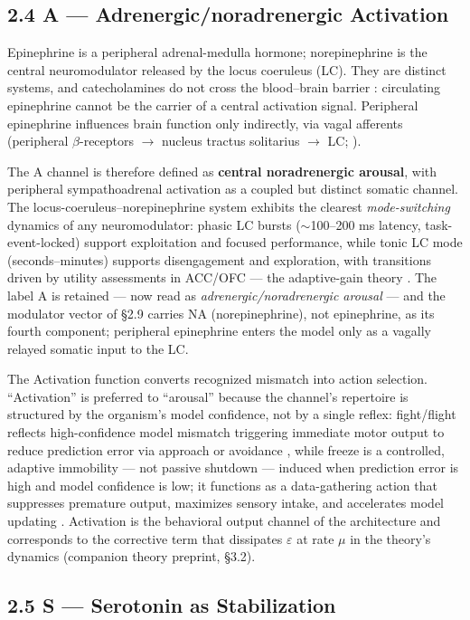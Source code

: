 \documentclass[
]{article}
\begin{document}
\subsection{2.4 A --- Adrenergic/noradrenergic
Activation}\label{a-adrenergicnoradrenergic-activation}

Epinephrine is a peripheral adrenal-medulla hormone; norepinephrine is
the central neuromodulator released by the locus coeruleus (LC). They
are distinct systems, and catecholamines do not cross the blood--brain
barrier : circulating epinephrine cannot be the carrier of a central
activation signal. Peripheral epinephrine influences brain function only
indirectly, via vagal afferents (peripheral \(\beta\)-receptors \(\to\)
nucleus tractus solitarius \(\to\) LC; ).

The A channel is therefore defined as \textbf{central noradrenergic
arousal}, with peripheral sympathoadrenal activation as a coupled but
distinct somatic channel. The locus-coeruleus--norepinephrine system
exhibits the clearest \emph{mode-switching} dynamics of any
neuromodulator: phasic LC bursts (\(\sim\)100--200 ms latency,
task-event-locked) support exploitation and focused performance, while
tonic LC mode (seconds--minutes) supports disengagement and exploration,
with transitions driven by utility assessments in ACC/OFC --- the
adaptive-gain theory . The label A is retained --- now read as
\emph{adrenergic/noradrenergic arousal} --- and the modulator vector of
§2.9 carries NA (norepinephrine), not epinephrine, as its fourth
component; peripheral epinephrine enters the model only as a vagally
relayed somatic input to the LC.

The Activation function converts recognized mismatch into action
selection. ``Activation'' is preferred to ``arousal'' because the
channel's repertoire is structured by the organism's model confidence,
not by a single reflex: fight/flight reflects high-confidence model
mismatch triggering immediate motor output to reduce prediction error
via approach or avoidance , while freeze is a controlled, adaptive
immobility --- not passive shutdown --- induced when prediction error is
high and model confidence is low; it functions as a data-gathering
action that suppresses premature output, maximizes sensory intake, and
accelerates model updating . Activation is the behavioral output channel
of the architecture and corresponds to the corrective term that
dissipates \(\varepsilon\) at rate \(\mu\) in the theory's dynamics
(companion theory preprint, §3.2).

\subsection{2.5 S --- Serotonin as
Stabilization}\label{s-serotonin-as-stabilization}
\end{document}
